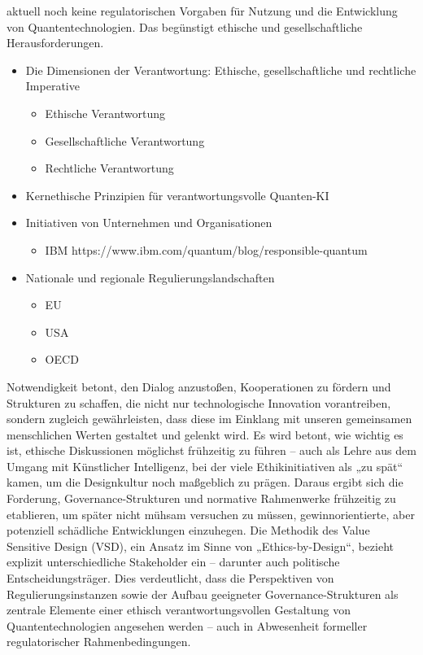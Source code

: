     aktuell noch keine regulatorischen Vorgaben für Nutzung und die Entwicklung von Quantentechnologien. Das begünstigt ethische und gesellschaftliche Herausforderungen. \cite{umbrello_quantum_2024} \cite{1-s2.0-S0370157324001078}
\begin{itemize}
    \item Die Dimensionen der Verantwortung: Ethische, gesellschaftliche und rechtliche Imperative
    \begin{itemize}
        \item Ethische Verantwortung
        \item Gesellschaftliche Verantwortung
        \item Rechtliche Verantwortung
    \end{itemize}
\item Kernethische Prinzipien für verantwortungsvolle Quanten-KI
\item Initiativen von Unternehmen und Organisationen
\begin{itemize}
    \item IBM https://www.ibm.com/quantum/blog/responsible-quantum
\end{itemize}
\item Nationale und regionale Regulierungslandschaften
\begin{itemize}
    \item EU
    \item USA
    \item OECD
\end{itemize}
\end{itemize}
    Notwendigkeit betont, den Dialog anzustoßen, Kooperationen zu fördern und Strukturen zu schaffen, die nicht nur technologische Innovation vorantreiben, sondern zugleich gewährleisten, dass diese im Einklang mit unseren gemeinsamen menschlichen Werten gestaltet und gelenkt wird. \cite{umbrello_quantum_2024}
    Es wird betont, wie wichtig es ist, ethische Diskussionen möglichst frühzeitig zu führen – auch als Lehre aus dem Umgang mit Künstlicher Intelligenz, bei der viele Ethikinitiativen als „zu spät“ kamen, um die Designkultur noch maßgeblich zu prägen. Daraus ergibt sich die Forderung, Governance-Strukturen und normative Rahmenwerke frühzeitig zu etablieren, um später nicht mühsam versuchen zu müssen, gewinnorientierte, aber potenziell schädliche Entwicklungen einzuhegen.\cite{1-s2.0-S0370157324001078}
    Die Methodik des Value Sensitive Design (VSD), ein Ansatz im Sinne von „Ethics-by-Design“, bezieht explizit unterschiedliche Stakeholder ein – darunter auch politische Entscheidungsträger. Dies verdeutlicht, dass die Perspektiven von Regulierungsinstanzen sowie der Aufbau geeigneter Governance-Strukturen als zentrale Elemente einer ethisch verantwortungsvollen Gestaltung von Quantentechnologien angesehen werden – auch in Abwesenheit formeller regulatorischer Rahmenbedingungen. \cite{umbrello_quantum_2024}

